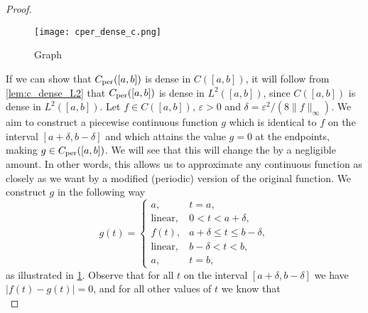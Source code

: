 \documentclass[../thesis.tex]{subfiles}
\begin{document}
\begin{proof}
    \begin{figure}
        \centering
        \texttt{[image: cper\_dense\_c.png]}
        \caption{Graph}
        \label{fig:g_periodic_close_to_f}
    \end{figure}
    If we can show that $C_{\text{per}}([a,b])$ is dense in $C([a,b])$, it will follow from \cref{lem:c_dense_L2} that $C_{\text{per}}([a,b])$ is dense in $L^2([a,b])$, since $C([a,b])$ is dense in $L^2([a,b])$. Let $f \in C([a,b])$, $\varepsilon>0$ and $\delta = \varepsilon^2/(8\|f\|_\infty)$. We aim to construct a piecewise continuous function $g$ which is identical to $f$ on the interval $[a+\delta,b-\delta ]$ and which attains the value $g = 0$ at the endpoints, making $g\in C_{\text{per}}([a,b])$. We will see that this will change the \Ltwonorm \space by a negligible amount. In other words, this allows us to approximate any continuous function as closely as we want by a modified (periodic) version of the original function. We construct $g$ in the following way  %
    \begin{equation*} %
        g(t) = 
        \begin{cases} a, &  t=a,\\  
            \text{linear}, &  0<t<a+\delta,\\ 
            f(t), & a+\delta \leq t \leq b-\delta,\\ 
            \text{linear}, &  b-\delta <t<b,\\ 
            a, &  t=b,
        \end{cases}
    \end{equation*} 
    as illustrated in \cref{fig:g_periodic_close_to_f}. Observe that for all $t$ on the interval $[a+\delta, b-\delta]$ we have $|f(t)-g(t)|= 0$, and for all other values of $t$ we know that
    \begin{equation*}

\end{equation*}
\end{proof}
\end{document}
